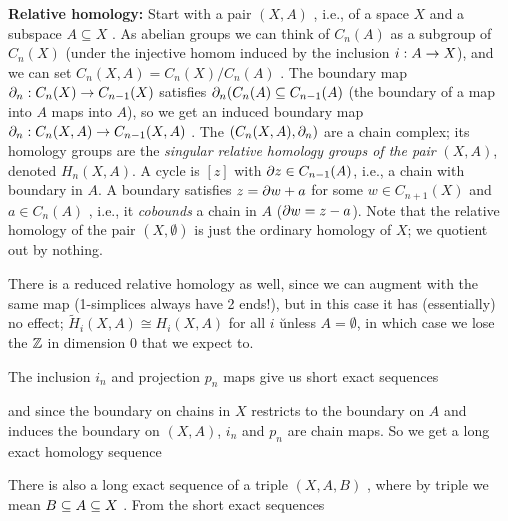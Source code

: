 {\bf Relative homology:} Start with
a pair $(X,A)$ , i.e., of a space $X$ and a subspace $A\subseteq X$ .
As abelian groups we can think of 
$C_n(A)$ as a subgroup of $C_n(X)$ (under the injective homom induced by the 
inclusion $i:A\rightarrow X$), and we can set $C_n(X,A)= C_n(X)/C_n(A)$ . The
boundary map $\partial_n:C_n(X)\rightarrow C_{n-1}(X)$ satisfies
$\partial_n(C_n(A)\subseteq C_{n-1}(A)$ (the boundary of a map into $A$ maps into $A$),
so we get an induced boundary map $\partial_n:C_n(X,A)\rightarrow C_{n-1}(X,A)$ . The
$(C_n(X,A),\partial_n)$ are a chain complex; its homology groups 
are the {\it singular relative homology groups of the pair} $(X,A)$,
denoted $H_n(X,A)$. A cycle is $[z]$ with $\partial z\in C_{n-1}(A)$,
i.e., a chain with boundary in $A$. A boundary satisfies
$z=\partial w +a$ for some $w\in C_{n+1}(X)$ and $a\in C_n(A)$ , i.e., it {\it cobounds}
a chain in $A$ ($\partial w = z-a$). Note that the relative homology of the pair 
$(X,\emptyset)$ is just the ordinary homology of $X$; we quotient out by nothing.

\ssk

There is a reduced relative homology 
as well, since we can augment with the same map (1-simplices always have 2 ends!),
but in this case it has (essentially) no effect; $\widetilde{H}_i(X,A)\cong H_i(X,A)$
for all $i$ \u{unless} $A=\emptyset$, in which case we lose the ${\Bbb Z}$ in
dimension 0 that we expect to. 

\ssk

The inclusion $i_n$ and projection  $p_n$ maps give us short exact sequences 

\ssk


and since the boundary on chains
in $X$ restricts to the boundary on $A$ and induces the boundary on $(X,A)$,
$i_n$ and $p_n$ are chain maps. So we get a long exact homology sequence

\ssk


\ssk

There is also a long exact sequence of a triple $(X,A,B)$ , where by triple we
mean $B\subseteq A\subseteq X$ . From the short exact sequences 

\ssk



